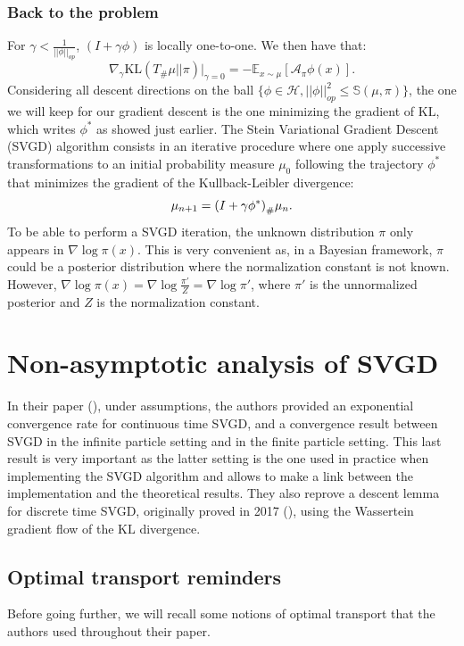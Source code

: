\documentclass{article}
\newcommand{\E}{\mathbb{E}}
\renewcommand{\S}{\mathbb{S}}
\newcommand{\A}{\mathcal{A}}
\newcommand{\KL}{\mathrm{KL}}
\renewcommand{\H}{\mathcal{H}}
\renewcommand{\S}{\mathbb{S}}
\DeclarePairedDelimiter{\pare}{(}{)}
\begin{document}
\subsubsection{Back to the problem}
For $\gamma < \frac{1}{||\phi||_{op}}$, $(I+\gamma \phi)$ is locally one-to-one. We then have that: $$\nabla_\gamma \KL(T_\#\mu||\pi)|_{\gamma = 0} = - \E_{x\sim \mu}[\A_\pi \phi(x)].$$ 
Considering all descent directions on the ball $\{\phi\in \H, ||\phi||^2_{op} \leq \S(\mu,\pi)\}$, the one we will keep for our gradient descent is the one minimizing the gradient of $\KL$, which writes $\phi^*$ as showed just earlier. \newline
The Stein Variational Gradient Descent (SVGD) algorithm consists
in an iterative procedure where one apply successive transformations
to an initial probability measure $\mu_0$ following
the trajectory $\phi^*$ that minimizes the gradient of the Kullback-Leibler divergence:
\begin{equation}
  \mu_{n+1} = \pare*{ I + \gamma \phi^* }_\# \mu_n.
  \label{eq:mu-n}
\end{equation}
To be able to perform a SVGD iteration, the unknown distribution $\pi$ only appears
in $\nabla \log \pi(x)$. This is very convenient as, in a Bayesian framework,
$\pi$ could be a posterior distribution where the normalization constant is not known.
However, $\nabla \log \pi(x) = \nabla \log \frac{\pi'}{Z} = \nabla \log \pi'$,
where $\pi'$ is the unnormalized posterior and $Z$ is the normalization constant.


\section{Non-asymptotic analysis of SVGD}
In their paper (\cite{main-paper}), under assumptions, the authors provided
an exponential convergence rate for continuous time SVGD, and
a convergence result between SVGD in the infinite particle setting
and in the finite particle setting.
This last result is very important as the latter
setting is the one used in practice
when implementing the SVGD algorithm and allows to
make a link between the implementation and the theoretical
results.
They also reprove a descent lemma for discrete time SVGD, originally
proved in 2017 (\cite{SVGD-flow}), using the Wassertein gradient
flow of the $\KL$ divergence.


\subsection{Optimal transport reminders}
Before going further, we will recall some notions of optimal transport
that the authors used throughout their paper.\\
\end{document}
